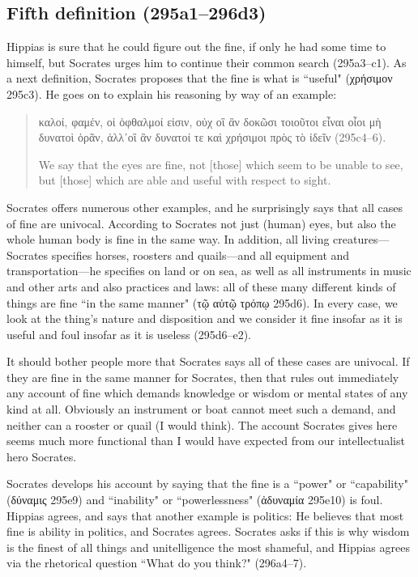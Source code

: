 \documentclass[12pt]{article}
\begin{document}
\subsection{Fifth definition (295a1--296d3)}

Hippias is sure that he could figure out the fine, if only he had some time to himself, but Socrates urges him to continue their common search (295a3--c1).  As a next definition, Socrates proposes that the fine is what is ``useful" ({\g χρήσιμον} 295c3).  He goes on to explain his reasoning by way of an example:

\begin{quote}
    {\g καλοί, φαμέν, οἱ ὀφθαλμοί εἰσιν, οὐχ οἳ ἂν δοκῶσι τοιοῦτοι εἶναι οἷοι μὴ δυνατοὶ ὁρᾶν, ἀλλ᾽οἳ ἂν δυνατοί τε καὶ χρήσιμοι πρὸς τὸ ἰδεῖν} (295c4--6).

    We say that the eyes are fine, not [those] which seem to be unable to see, but [those] which are able and useful with respect to sight.
\end{quote}

Socrates offers numerous other examples, and he surprisingly says that all cases of fine are univocal.  According to Socrates not just (human) eyes, but also the whole human body is fine in the same way.  In addition, all living creatures---Socrates specifies horses, roosters and quails---and all equipment and transportation---he specifies on land or on sea, as well as all instruments in music and other arts and also practices and laws: all of these many different kinds of things are fine ``in the same manner" ({\g τῷ αὐτῷ τρόπῳ} 295d6).  In every case, we look at the thing's nature and disposition and we consider it fine insofar as it is useful and foul insofar as it is useless (295d6--e2).

It should bother people more that Socrates says all of these cases are univocal.  If they are fine in the same manner for Socrates, then that rules out immediately any account of fine which demands knowledge or wisdom or mental states of any kind at all.  Obviously an instrument or boat cannot meet such a demand, and neither can a rooster or quail (I would think).  The account Socrates gives here seems much more functional than I would have expected from our intellectualist hero Socrates.

Socrates develops his account by saying that the fine is a ``power" or ``capability" ({\g δύναμις} 295e9) and ``inability" or ``powerlessness" ({\g ἀδυναμία} 295e10) is foul.  Hippias agrees, and says that another example is politics: He believes that most fine is ability in politics, and Socrates agrees.  Socrates asks if this is why wisdom is the finest of all things and unitelligence the most shameful, and Hippias agrees via the rhetorical question ``What do you think?" (296a4--7).
\end{document}
